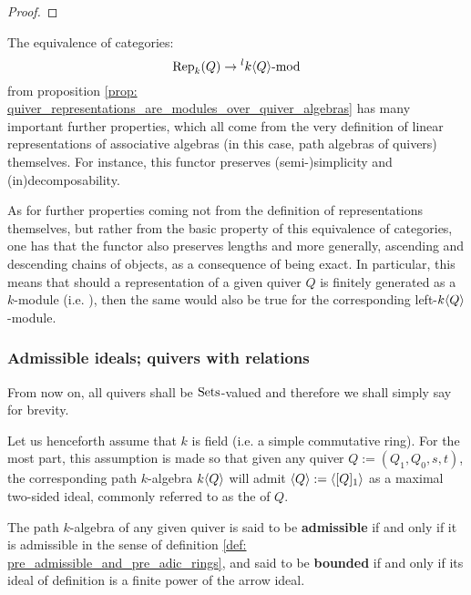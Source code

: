                 \begin{proof}
                    
                \end{proof}
            \begin{remark}
                The equivalence of categories:
                    $$\mathrm{Rep}_{k}(Q) \to {}^lk\langle Q\rangle\text{-}\mathrm{mod}$$
                from proposition \ref{prop: quiver_representations_are_modules_over_quiver_algebras} has many important further properties, which all come from the very definition of linear representations of associative algebras (in this case, path algebras of quivers) themselves. For instance, this functor preserves (semi-)simplicity and (in)decomposability.
                
                As for further properties coming not from the definition of representations themselves, but rather from the basic property of this equivalence of categories, one has that the functor also preserves lengths and more generally, ascending and descending chains of objects, as a consequence of being exact. In particular, this means that should a representation of a given quiver $Q$ is finitely generated as a $k$-module (i.e. ), then the same would also be true for the corresponding left-$k\langle Q\rangle$-module.
            \end{remark}
            
        \subsubsection{Admissible ideals; quivers with relations}
            \begin{convention}
                From now on, all quivers shall be $\mathrm{Sets}$-valued and therefore we shall simply say  for brevity.
            \end{convention}
            \begin{convention}
                Let us henceforth assume that $k$ is field (i.e. a simple commutative ring). For the most part, this assumption is made so that given any quiver $Q := (Q_1, Q_0, s, t)$, the corresponding path $k$-algebra $k\langle Q\rangle$ will admit $\langle Q\rangle := \langle[Q]_1\rangle$ as a maximal two-sided ideal, commonly referred to as the  of $Q$.
            \end{convention}
            
            \begin{definition} \label{def: admissible_ideals_of_path_algebras}
                The path $k$-algebra of any given quiver is said to be \textbf{admissible} if and only if it is admissible in the sense of definition \ref{def: pre_admissible_and_pre_adic_rings}, and said to be \textbf{bounded} if and only if its ideal of definition is a finite power of the arrow ideal.
            \end{definition}
            
